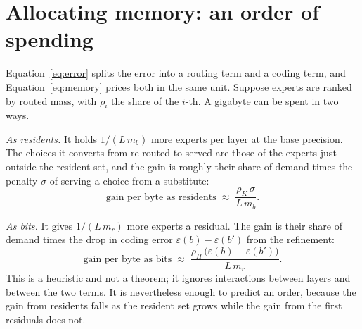 \documentclass[11pt]{article}
\begin{document}
\FloatBarrier
\section{Allocating memory: an order of spending}
\label{sec:principle}

Equation~\ref{eq:error} splits the error into a routing term and a coding term, and
Equation~\ref{eq:memory} prices both in the same unit. Suppose experts are ranked by routed
mass, with $\rho_i$ the share of the $i$-th. A gigabyte can be spent in two ways.

\emph{As residents.} It holds $1/(L\,m_b)$ more experts per layer at the base precision. The
choices it converts from re-routed to served are those of the experts just outside the resident
set, and the gain is roughly their share of demand times the penalty $\sigma$ of serving a
choice from a substitute:
\begin{equation}
  \text{gain per byte as residents} \;\approx\; \frac{\rho_{K}\,\sigma}{L\,m_b}.
\end{equation}

\emph{As bits.} It gives $1/(L\,m_r)$ more experts a residual. The gain is their share of demand
times the drop in coding error $\varepsilon(b)-\varepsilon(b')$ from the refinement:
\begin{equation}
  \text{gain per byte as bits} \;\approx\; \frac{\rho_{H}\,\bigl(\varepsilon(b)-\varepsilon(b')\bigr)}{L\,m_r}.
\end{equation}
This is a heuristic and not a theorem; it ignores interactions between layers and between the
two terms. It is nevertheless enough to predict an order, because the gain from residents falls as the resident set grows while the gain from the first residuals does not.
\end{document}
